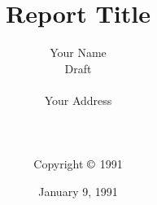 
%
%


\newenvironment{packed}{\begin{list}{$\bullet$}{\parsep0in\itemsep0in}}{\end{list}}


\newcommand{\wgmparagraph}[1]{\paragraph{#1}\verb" "\\}

%
%
%
\newcommand{\subsectionnotoc}[1]{\verb" "\\{\large\bf #1}\verb" "\\}


\setlength{\textwidth}{6.5in}
\setlength{\oddsidemargin}{0in}
\setcounter{secnumdepth}{8}


\title {Report Title\\}
\author {Your Name\\
Draft \\
\\
Your Address
\\
\date {January 9, 1991}\\
\vspace{2.5in}\\
Copyright $\copyright$ 1991}


